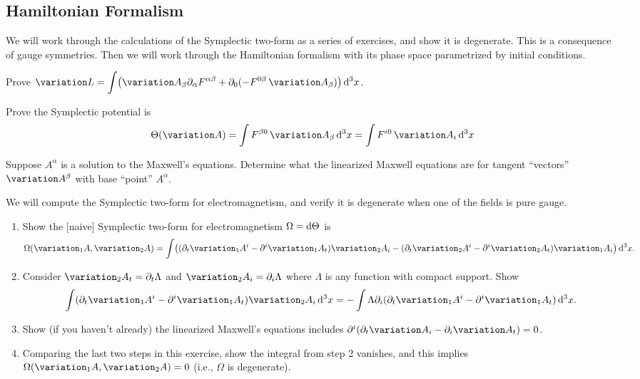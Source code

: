 \subsection{Hamiltonian Formalism}

\M We will work through the calculations of the Symplectic two-form as a
series of exercises, and show it is degenerate. This is a consequence of
gauge symmetries. Then we will work through the Hamiltonian formalism
with its phase space parametrized by initial conditions.

\begin{exercise}
Prove $\displaystyle\variation L = \int\bigl(\variation A_{\beta}\partial_{\alpha}F^{\alpha\beta}+\partial_{0}(-F^{0\beta}\,\variation A_{\beta})\bigr)\,\D^{3}x$.
\end{exercise}

\begin{exercise}
  Prove the Symplectic potential is
  \[ \Theta(\variation A) = \int F^{\beta0}\,\variation A_{\beta}\,\D^{3}x =\int F^{i0}\,\variation A_{i}\,\D^{3}x\]
\end{exercise}

\begin{exercise}
Suppose $A^{\alpha}$ is a solution to the Maxwell's equations. Determine
what the linearized Maxwell equations are for tangent ``vectors''
$\variation A^{\beta}$ with base ``point'' $A^{\alpha}$.
\end{exercise}

\begin{exercise}
We will compute the Symplectic two-form for electromagnetism, and verify
it is degenerate when one of the fields is pure gauge.
\begin{enumerate}
\item Show the [naive] Symplectic two-form for electromagnetism $\Omega=\mathrm{d}\Theta$
is
\[\Omega(\variation_{1}A,\variation_{2}A) = \int\bigl((\partial_{t}\variation_{1}A^{i}-\partial^{i}\variation_{1}A_{t})\variation_{2}A_{i}-(\partial_{t}\variation_{2}A^{i}-\partial^{i}\variation_{2}A_{t})\variation_{1}A_{i}\bigr)\,\D^{3}x.\]
\item Consider $\variation_{2}A_{t}=\partial_{t}\Lambda$ and
  $\variation_{2}A_{i}=\partial_{i}\Lambda$ where $\Lambda$ is any
  function with compact support. Show
\[\int(\partial_{t}\variation_{1}A^{i}-\partial^{i}\variation_{1}A_{t})\variation_{2}A_{i}\,\D^{3}x=-\int\Lambda\partial_{i}(\partial_{t}\variation_{1}A^{i}-\partial^{i}\variation_{1}A_{t})\,\D^{3}x.\]
\item Show (if you haven't already) the linearized Maxwell's equations
  includes $\partial^{i}(\partial_{t}\variation A_{i}-\partial_{i}\variation A_{t})=0$.
\item Comparing the last two steps in this exercise, show the integral
  from step 2 vanishes, and this implies $\Omega(\variation_{1}A,\variation_{2}A) =0$
 (i.e., $\Omega$ is degenerate).
\end{enumerate}
\end{exercise}

